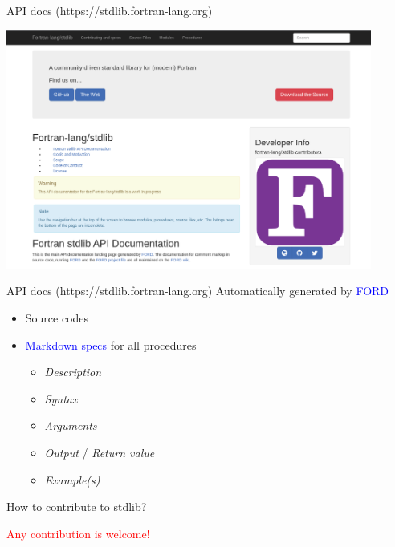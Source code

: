 \documentclass{beamer}
\begin{document}
\begin{frame}[c]{API docs (https://stdlib.fortran-lang.org)}
	\begin{center}
	\includegraphics[width=0.9\textwidth]{apidocsstdlib}
	\end{center}
\end{frame}


\begin{frame}[c]{API docs (https://stdlib.fortran-lang.org)}
	Automatically generated by \textcolor{blue}{FORD} %
	\begin{itemize}
		\item Source codes
		\item \textcolor{blue}{Markdown specs} for all procedures
		\begin{itemize}
			\item \textit{Description}
			\item \textit{Syntax}
			\item \textit{Arguments}
			\item \textit{Output} / \textit{Return value}
			\item \textit{Example(s)}
		\end{itemize}
	\end{itemize}

\end{frame}


\begin{frame}[c]{How to contribute to stdlib?}
	\begin{center}
	\Huge{\textcolor{red}{Any contribution is welcome!}}
	\end{center}
\end{frame}
\end{document}
